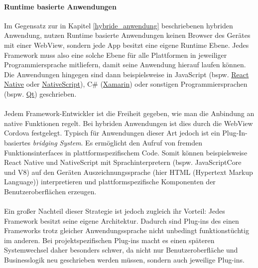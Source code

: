 \paragraph{Runtime basierte Anwendungen}
\label{runtime_based_apps}
Im Gegensatz zur in Kapitel \ref{hybride_anwendung} beschriebenen hybriden Anwendung, nutzen Runtime basierte Anwendungen keinen Browser des Gerätes mit einer WebView, sondern jede App besitzt eine eigene Runtime Ebene. 
Jedes Framework muss also eine solche Ebene für alle Plattformen in jeweiliger Programmiersprache mitliefern, damit seine Anwendung hierauf laufen können.
Die Anwendungen hingegen sind dann beispielsweise in JavaScript (bspw. \href{https://reactnative.dev/}{React Native} oder \href{https://nativescript.org/}{NativeScript}), C\# (\href{https://dotnet.microsoft.com/apps/xamarin}{Xamarin}) oder sonstigen Programmiersprachen (bspw. \href{https://www.qt.io/}{Qt}) geschrieben.\\
\\
Jedem Framework-Entwickler ist die Freiheit gegeben, wie man die Anbindung an native Funktionen regelt. Bei hybriden Anwendungen ist dies durch die WebView Cordova festgelegt.
Typisch für Anwendungen dieser Art jedoch ist ein Plug-In-basiertes \textit{bridging System}. Es ermöglicht den Aufruf von fremden Funktionsinterfaces in plattformspezifischem Code.
Somit können beispielsweise React Native und NativeScript mit Sprachinterpretern (bspw. JavaScriptCore und V8) auf den Geräten Auszeichnungssprache (hier HTML (Hypertext Markup Language)) interpretieren und plattformspezifische Komponenten der Benutzeroberflächen erzeugen.\\
\\
Ein großer Nachteil dieser Strategie ist jedoch zugleich ihr Vorteil: Jedes Framework besitzt seine eigene Architektur. Dadurch sind Plug-ins des einen Frameworks trotz gleicher Anwendungssprache nicht unbedingt funktionstüchtig im anderen. 
Bei projektspezifischen Plug-ins macht es einen späteren Systemwechsel daher besonders schwer, da nicht nur Benutzeroberfläche und Businesslogik neu geschrieben werden müssen, sondern auch jeweilige Plug-ins. \cite{bjorn-hansen2020}

